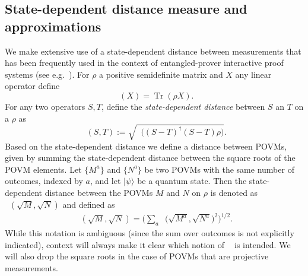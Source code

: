 \documentclass[11pt,letterpaper]{article}
\newcommand{\<}{\langle}
\renewcommand{\>}{\rangle}
\newtheorem{theorem}{Theorem}
\newcommand{\ket}[1]{| #1 \>}
\DeclareMathOperator{\Tr}{Tr}
\DeclareMathOperator{\DIS}{d}
\DeclareMathOperator{\Drho}{\DIS_\rho}
\DeclareMathOperator{\Trho}{\Tr_\rho}
\begin{document}

\subsection{State-dependent distance measure and approximations}

We make extensive use of a state-dependent distance
between measurements that has been frequently used in the context of
entangled-prover interactive proof systems (see
e.g.~\cite{IV12,ji2015classical}). For $\rho$ a positive semidefinite matrix and $X$ any linear operator define
$$ \Trho(X) = \Tr(\rho X).$$ 
For any two operators $S, T$, define the
\emph{state-dependent distance} between $S$ an $T$ on a $\rho$ as
$$ \Drho(S, T) := \sqrt{\Trho\big( (S-T)^\dagger(S-T)\rho\big)}.$$
Based on the state-dependent distance we define a distance between POVMs, given by
summing the state-dependent distance between the square roots of the POVM elements.
Let $\{M^a\}$ and $\{N^a\}$ be two POVMs
with the same number of outcomes, indexed by $a$, and let
$\ket{\psi}$ be a quantum state. Then the state-dependent distance between the POVMs
$M$ and $N$ on $\rho$ is denoted as $\Drho(\sqrt{M}, \sqrt{N})$ and
defined as
\begin{align*}
  \Drho(\sqrt{M}, \sqrt{N}) = \Big(\sum_a \Drho\big(\sqrt{M^a}, \sqrt{N^a}\big)^2\Big)^{1/2}.
\end{align*}
While this notation is ambiguous (since the sum over outcomes is not explicitly
indicated), context will always make it clear which notion of $\Drho$ is
intended. We will also drop the square roots in the case of POVMs that are
projective measurements.
\end{document}
